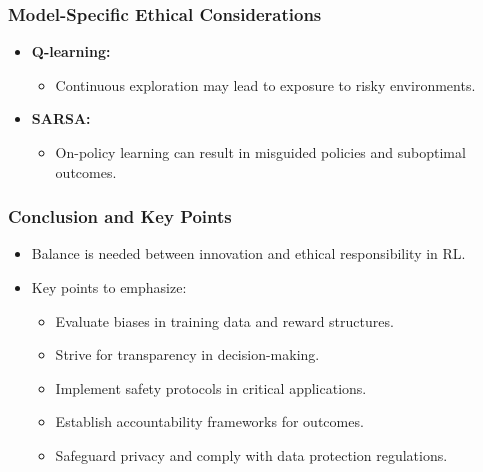 \documentclass{beamer}
\begin{document}
\begin{frame}[fragile]
    \frametitle{Model-Specific Ethical Considerations}
    \begin{itemize}
        \item \textbf{Q-learning:}
            \begin{itemize}
                \item Continuous exploration may lead to exposure to risky environments.
            \end{itemize}
        
        \item \textbf{SARSA:}
            \begin{itemize}
                \item On-policy learning can result in misguided policies and suboptimal outcomes.
            \end{itemize}
    \end{itemize}
\end{frame}

\begin{frame}[fragile]
    \frametitle{Conclusion and Key Points}
    \begin{itemize}
        \item Balance is needed between innovation and ethical responsibility in RL.
        \item Key points to emphasize:
        \begin{itemize}
            \item Evaluate biases in training data and reward structures.
            \item Strive for transparency in decision-making.
            \item Implement safety protocols in critical applications.
            \item Establish accountability frameworks for outcomes.
            \item Safeguard privacy and comply with data protection regulations.
        \end{itemize}
    \end{itemize}
\end{frame}
\end{document}
